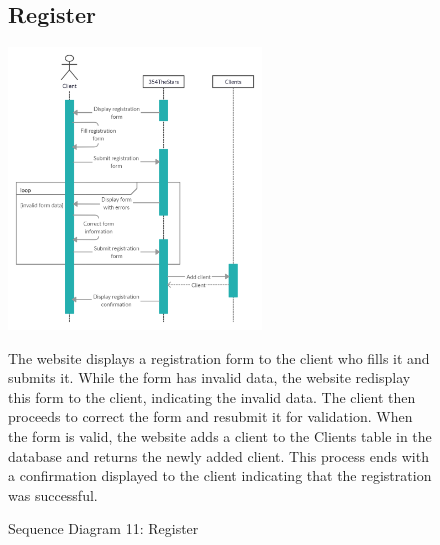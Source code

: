 \documentclass[11pt]{article}
\begin{document}
\begin{figure}[ht!]
    \subsection{Register}
    \centering
    \includegraphics[width=0.6\textwidth,height=0.3\paperheight]{Diagrams/Sequence/Register.jpg} 
    \caption{Sequence Diagram 11: Register}
    \label{fig: Register}
    \begin{flushleft}
        The website displays a registration form to the client who fills it and submits it. While the form has invalid data, the website redisplay this form to the client, indicating the invalid data. The client then proceeds to correct the form and resubmit it for validation. When the form is valid, the website adds a client to the Clients table in the database and returns the newly added client. This process ends with a confirmation displayed to the client indicating that the registration was successful.
    \end{flushleft}
\end{figure}
\end{document}
